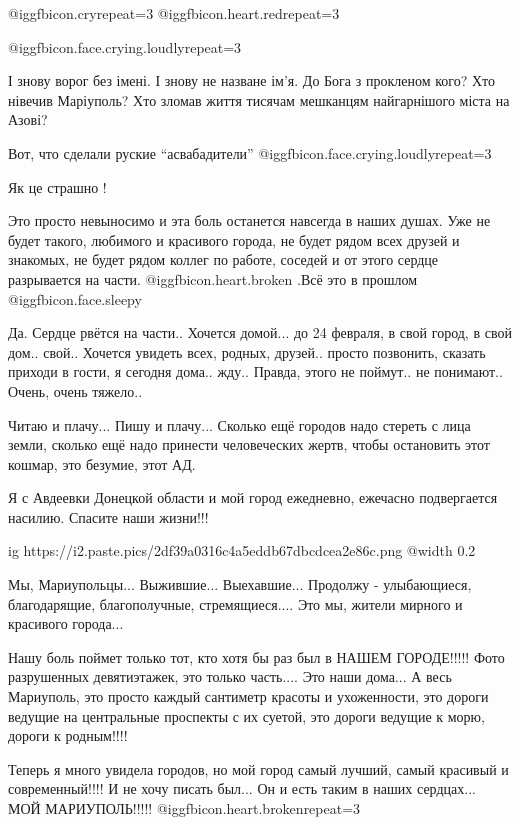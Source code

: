 \begin{itemize}
 @igg{fbicon.cry}{repeat=3} @igg{fbicon.heart.red}{repeat=3}

 @igg{fbicon.face.crying.loudly}{repeat=3} 


І знову ворог без імені. І знову не назване ім'я. До Бога з прокленом кого? Хто
нівечив Маріуполь? Хто зломав життя тисячам мешканцям найгарнішого міста на
Азові?

Вот, что сделали руские \enquote{асвабадители} @igg{fbicon.face.crying.loudly}{repeat=3} 

Як це страшно !


Это просто невыносимо и эта боль останется навсегда в наших душах. Уже не будет
такого, любимого и красивого города, не будет рядом всех друзей и знакомых, не
будет рядом коллег по работе, соседей и от этого сердце разрывается на
части. @igg{fbicon.heart.broken} .Всё это в прошлом @igg{fbicon.face.sleepy} 


Да. Сердце рвётся на части..
Хочется домой... до 24 февраля, в свой город, в свой дом.. свой..
Хочется увидеть всех, родных, друзей.. просто позвонить, сказать приходи в гости, я сегодня дома.. жду..
Правда, этого не поймут.. не понимают..
Очень, очень тяжело..


Читаю и плачу... Пишу и плачу... Сколько ещё городов надо стереть с лица земли,
сколько ещё надо принести человеческих жертв, чтобы остановить этот кошмар, это
безумие, этот АД.

Я с Авдеевки Донецкой области и мой город ежедневно, ежечасно подвергается
насилию. Спасите наши жизни!!!


\ifcmt
  ig https://i2.paste.pics/2df39a0316c4a5eddb67dbcdcea2e86c.png
  @width 0.2
\fi


Мы, Мариупольцы... Выжившие... Выехавшие... Продолжу - улыбающиеся, благодарящие,
благополучные, стремящиеся.... Это мы, жители мирного и красивого города...

Нашу боль поймет только тот, кто хотя бы раз был в НАШЕМ ГОРОДЕ!!!!! Фото
разрушенных девятиэтажек, это только часть.... Это наши дома... А весь Мариуполь,
это просто каждый сантиметр красоты и ухоженности, это дороги ведущие на
центральные проспекты с их суетой, это дороги ведущие к морю, дороги к
родным!!!!

Теперь я много увидела городов, но мой город самый лучший, самый красивый и
современный!!!! И не хочу писать был... Он и есть таким в наших сердцах... МОЙ
МАРИУПОЛЬ!!!!! @igg{fbicon.heart.broken}{repeat=3} 

\end{itemize} %
